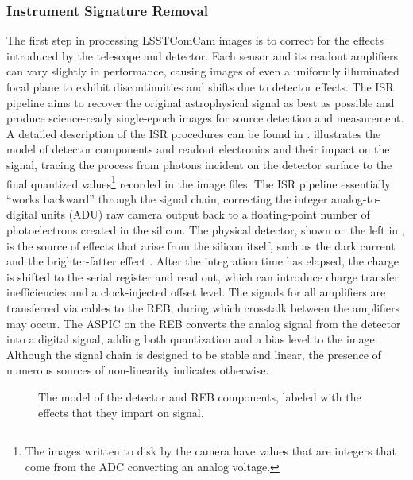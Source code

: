 \subsubsection{Instrument Signature Removal}
\label{ssec:isr}
The first step in processing \gls{LSSTComCam} images is to correct for the effects introduced by the telescope and detector.
Each sensor and its readout amplifiers can vary slightly in performance, causing images of even a uniformly illuminated focal plane to exhibit discontinuities and shifts due to detector effects.
The \gls{ISR} pipeline aims to recover the original astrophysical signal as best as possible and produce science-ready single-epoch images for source detection and measurement.
A detailed description of the \gls{ISR} procedures can be found in \citet{SITCOMTN-086,2025JATIS..11a1209P}.
 illustrates the model of detector components and readout electronics and their impact on the signal, tracing the process from photons incident on the detector surface to the final quantized values\footnote{The images written to disk by the camera have values that are integers that come from the ADC converting an analog voltage.} recorded in the image files.
The \gls{ISR} \gls{pipeline} essentially ``works backward'' through the signal chain, correcting the integer analog-to-digital units (ADU) raw camera output back to a floating-point number of photoelectrons created in the silicon.
The physical detector, shown on the left in  , is the source of effects that arise from the silicon itself, such as the dark current and the brighter-fatter effect \citep{doi:10.1088/1538-3873/aab820,2024PASP..136d5003B}.
After the integration time has elapsed, the charge is shifted  to the serial register and read out, which can introduce charge transfer inefficiencies and a clock-injected offset level.
The signals for all amplifiers are transferred via cables to the \gls{REB}, during which crosstalk between the amplifiers may occur.
The \gls{ASPIC} on the \gls{REB} converts the analog signal from the detector into a digital signal, adding both quantization and a bias level to the image.
Although the signal chain is designed to be stable and linear, the presence of numerous sources of non-linearity indicates otherwise.
\begin{figure}[htb]
  \centering
  \caption{The model of the detector and REB components, labeled with the effects that they impart on signal.}
  \label{fig:isr_signal_chain}
\end{figure}

